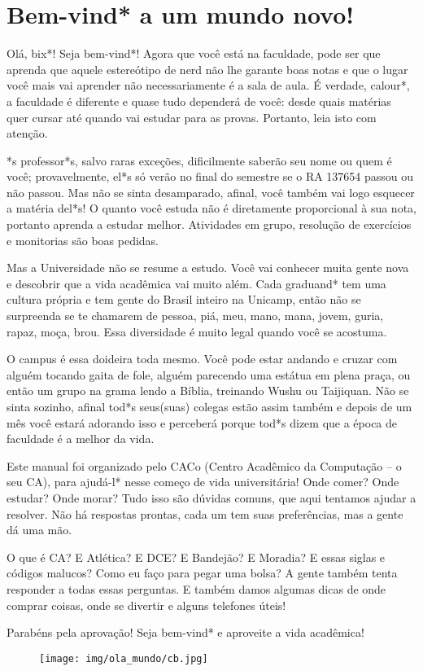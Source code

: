 
\section{Bem-vind* a um mundo novo!}

Olá, bix*! Seja bem-vind*! Agora que você está na faculdade, pode ser que
aprenda que aquele estereótipo de nerd não lhe garante boas notas e que o lugar
você mais vai aprender não necessariamente é a sala de aula. É verdade,
calour*, a faculdade é diferente e quase tudo dependerá de você: desde quais
matérias quer cursar até quando vai estudar para as provas. Portanto, leia isto
com atenção.

*s professor*s, salvo raras exceções, dificilmente saberão seu nome ou quem é
você; provavelmente, el*s só verão no final do semestre se o RA 137654 passou
ou não passou. Mas não se sinta desamparado, afinal, você também vai logo
esquecer a matéria del*s! O quanto você estuda não é diretamente proporcional à
sua nota, portanto aprenda a estudar melhor. Atividades em grupo, resolução de
exercícios e monitorias são boas pedidas.

Mas a Universidade não se resume a estudo. Você vai conhecer muita gente nova e
descobrir que a vida acadêmica vai muito além.  Cada graduand* tem uma cultura
própria e tem gente do Brasil inteiro na Unicamp, então não se surpreenda se te
chamarem de pessoa, piá, meu, mano, mana, jovem, guria, rapaz, moça, brou.
Essa diversidade é muito legal quando você se acostuma.

O campus é essa doideira toda mesmo. Você pode estar andando e cruzar com
alguém tocando gaita de fole, alguém parecendo uma estátua em plena praça, ou
então um grupo na grama lendo a Bíblia, treinando Wushu ou Taijiquan. Não se
sinta sozinho, afinal tod*s seus(suas) colegas estão assim também e depois de
um mês você estará adorando isso e perceberá porque tod*s dizem que a época de
faculdade é a melhor da vida.

Este manual foi organizado pelo CACo (Centro Acadêmico da Computação -- o seu
CA), para ajudá-l* nesse começo de vida universitária! Onde comer? Onde
estudar? Onde morar? Tudo isso são dúvidas comuns, que aqui tentamos ajudar a
resolver. Não há respostas prontas, cada um tem suas preferências, mas a gente
dá uma mão.

O que é CA? E Atlética? E DCE? E Bandejão? E Moradia? E essas siglas e códigos
malucos? Como eu faço para pegar uma bolsa? A gente também tenta responder a
todas essas perguntas. E também damos algumas dicas de onde comprar coisas,
onde se divertir e alguns telefones úteis!

Parabéns pela aprovação! Seja bem-vind* e aproveite a vida acadêmica!

\begin{figure}[t]
    \texttt{[image: img/ola\_mundo/cb.jpg]}
\end{figure}
